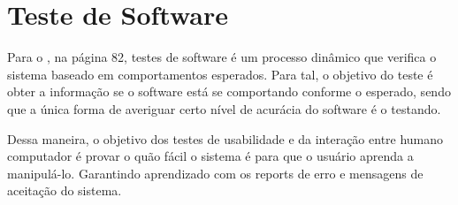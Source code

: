 \section{Teste de Software}
\label{sec:Teste de Software}

Para o \cite{swebok}, na página 82, testes de software é um processo dinâmico que verifica o sistema
baseado em comportamentos esperados. Para tal, o objetivo do teste é obter a
informação se o software está se comportando conforme o esperado, sendo que a
única forma de averiguar certo nível de acurácia do software é o testando.

Dessa maneira, o objetivo dos testes de usabilidade e da interação entre humano
computador é provar o quão fácil o sistema é para que o usuário aprenda a manipulá-lo.
Garantindo aprendizado com os reports de erro e mensagens de aceitação do sistema.
